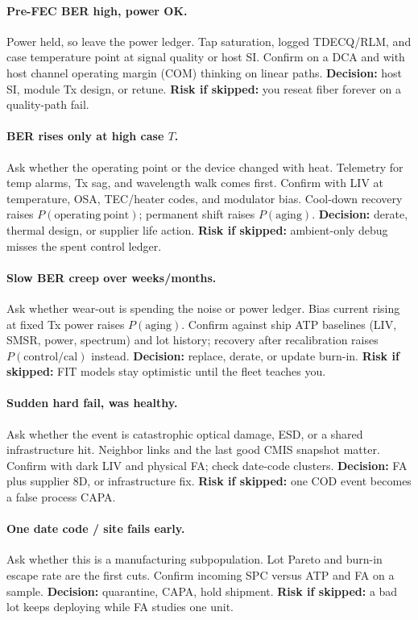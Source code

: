 \paragraph{Pre-FEC BER high, power OK.}
Power held, so leave the power ledger. Tap saturation, logged TDECQ/RLM, and
case temperature point at signal quality or host SI. Confirm on a DCA and with
host channel operating margin (COM) thinking on linear paths.
\textbf{Decision:} host SI, module Tx design, or retune. \textbf{Risk if
skipped:} you reseat fiber forever on a quality-path fail.

\paragraph{BER rises only at high case $T$.}
Ask whether the operating point or the device changed with heat. Telemetry for
temp alarms, Tx sag, and wavelength walk comes first. Confirm with LIV at
temperature, OSA, TEC/heater codes, and modulator bias. Cool-down recovery
raises $P(\mathrm{operating\ point})$; permanent shift raises
$P(\mathrm{aging})$. \textbf{Decision:} derate, thermal design, or supplier
life action. \textbf{Risk if skipped:} ambient-only debug misses the spent
control ledger.

\paragraph{Slow BER creep over weeks/months.}
Ask whether wear-out is spending the noise or power ledger. Bias current
rising at fixed Tx power raises $P(\mathrm{aging})$. Confirm against ship
ATP baselines (LIV, SMSR, power, spectrum) and lot history; recovery after
recalibration raises $P(\mathrm{control/cal})$ instead. \textbf{Decision:}
replace, derate, or update burn-in. \textbf{Risk if skipped:} FIT models stay
optimistic until the fleet teaches you.

\paragraph{Sudden hard fail, was healthy.}
Ask whether the event is catastrophic optical damage, ESD, or a shared
infrastructure hit. Neighbor links and the last good CMIS snapshot matter.
Confirm with dark LIV and physical FA; check date-code clusters.
\textbf{Decision:} FA plus supplier 8D, or infrastructure fix.
\textbf{Risk if skipped:} one COD event becomes a false process CAPA.

\paragraph{One date code / site fails early.}
Ask whether this is a manufacturing subpopulation. Lot Pareto and burn-in
escape rate are the first cuts. Confirm incoming SPC versus ATP and FA on a
sample. \textbf{Decision:} quarantine, CAPA, hold shipment. \textbf{Risk if
skipped:} a bad lot keeps deploying while FA studies one unit.

